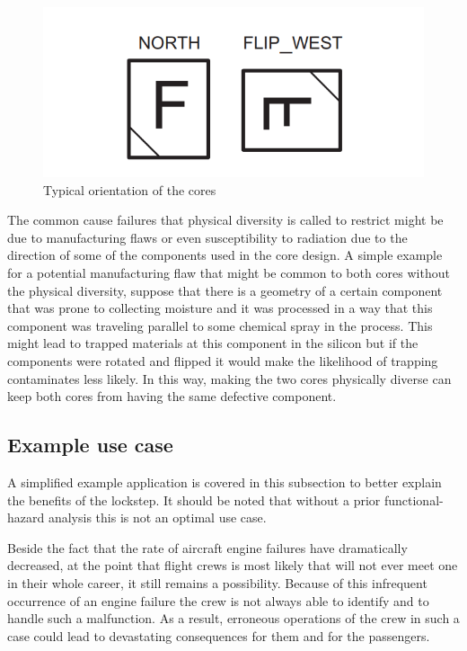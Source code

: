 \begin{figure}[H]

      \centering
      \includegraphics[width=0.8\linewidth]{images/lockstep_cpu_position.png}
      \caption{Typical orientation of the cores \citep{safety_maual_tms570ls31x}}
      \label{fig:lockstep_cpu_position}
    
\end{figure}

The common cause failures
that physical diversity is called to restrict might be due to manufacturing flaws
or even susceptibility to radiation due to the direction of some of the components
used in the core design. A simple example for a potential manufacturing flaw that
might be common to both cores without the physical diversity, suppose that there
is a geometry of a certain component that was prone to collecting moisture and it was processed in a way that this component was traveling parallel to some chemical spray in the process. This might lead to trapped materials at this component
in the silicon but if the components were rotated and flipped it would make the
likelihood of trapping contaminates less likely. In this way, making the two cores
physically diverse can keep both cores from having the same defective component. \citep{lockstep_analysis}

\subsection{Example use case \citep{lockstep_analysis}}

A simplified example application is covered in this subsection to better explain the benefits of the lockstep. It should be noted that without a prior functional-hazard analysis this is not an optimal use case.

Beside the fact that the rate of aircraft engine failures have dramatically decreased,
at the point that flight crews is most likely that will not ever meet one in their
whole career, it still remains a possibility. Because of this infrequent occurrence
of an engine failure the crew is not always able to identify and to handle such a
malfunction. As a result, erroneous operations of the crew in such a case could
lead to devastating consequences for them and for the passengers.

